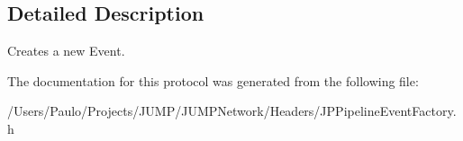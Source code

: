 \subsection{Detailed Description}
Creates a new Event. 

The documentation for this protocol was generated from the following file:\begin{DoxyCompactItemize}
\item 
/Users/Paulo/Projects/JUMP/JUMPNetwork/Headers/JPPipelineEventFactory.h\end{DoxyCompactItemize}
